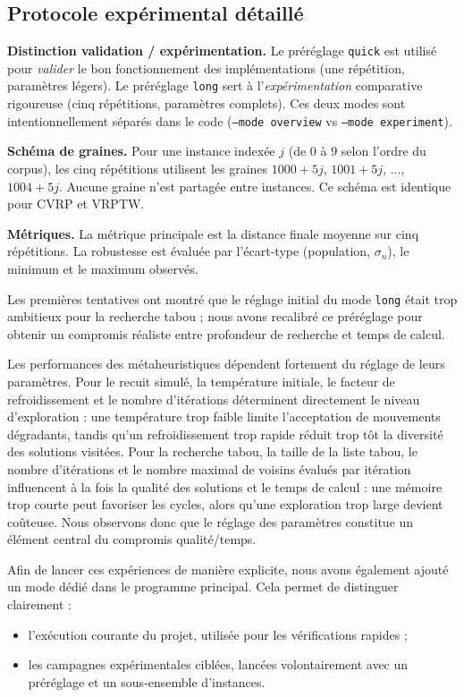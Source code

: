 \documentclass[11pt,a4paper]{article}
\begin{document}
\subsection{Protocole expérimental détaillé}

\textbf{Distinction validation / expérimentation.} Le préréglage \texttt{quick} est utilisé pour \emph{valider} le bon fonctionnement des implémentations (une répétition, paramètres légers). Le préréglage \texttt{long} sert à l'\emph{expérimentation} comparative rigoureuse (cinq répétitions, paramètres complets). Ces deux modes sont intentionnellement séparés dans le code (\texttt{--mode overview} vs \texttt{--mode experiment}).

\textbf{Schéma de graines.} Pour une instance indexée $j$ (de $0$ à $9$ selon l'ordre du corpus), les cinq répétitions utilisent les graines $1000+5j$, $1001+5j$, $\ldots$, $1004+5j$. Aucune graine n'est partagée entre instances. Ce schéma est identique pour CVRP et VRPTW.

\textbf{Métriques.} La métrique principale est la distance finale moyenne sur cinq répétitions. La robustesse est évaluée par l'écart-type (population, $\sigma_n$), le minimum et le maximum observés.

Les premières tentatives ont montré que le réglage initial du mode \texttt{long} était trop ambitieux pour la recherche tabou ; nous avons recalibré ce préréglage pour obtenir un compromis réaliste entre profondeur de recherche et temps de calcul.

Les performances des métaheuristiques dépendent fortement du réglage de leurs paramètres. Pour le recuit simulé, la température initiale, le facteur de refroidissement et le nombre d'itérations déterminent directement le niveau d'exploration : une température trop faible limite l'acceptation de mouvements dégradants, tandis qu'un refroidissement trop rapide réduit trop tôt la diversité des solutions visitées. Pour la recherche tabou, la taille de la liste tabou, le nombre d'itérations et le nombre maximal de voisins évalués par itération influencent à la fois la qualité des solutions et le temps de calcul : une mémoire trop courte peut favoriser les cycles, alors qu'une exploration trop large devient coûteuse. Nous observons donc que le réglage des paramètres constitue un élément central du compromis qualité/temps.

Afin de lancer ces expériences de manière explicite, nous avons également ajouté un mode dédié dans le programme principal. Cela permet de distinguer clairement :
\begin{itemize}
    \item l'exécution courante du projet, utilisée pour les vérifications rapides ;
    \item les campagnes expérimentales ciblées, lancées volontairement avec un préréglage et un sous-ensemble d'instances.
\end{itemize}
\end{document}
